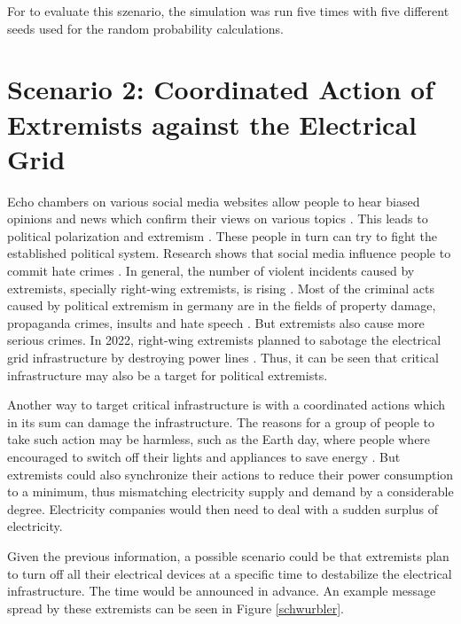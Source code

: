 For to evaluate this szenario, the simulation was run five times with five 
different seeds used for the random probability calculations.
 

\section{Scenario 2: Coordinated Action of Extremists 
against the Electrical Grid}

Echo chambers on various social media websites allow people to 
hear biased opinions and news which confirm their views on 
various topics \cite{terren2021echo}. This leads to political
polarization and extremism \cite{van2022banality}.
These people in turn can try to fight the established political
system. Research shows that social media influence people
to commit hate crimes \cite{muller2021fanning}.
In general, the number of violent incidents caused by
extremists, specially right-wing extremists, is rising 
\cite{koehler2016right}. 
Most of the criminal acts caused by political extremism 
in germany are in the fields of property damage, 
propaganda crimes, insults and hate speech \cite{bmicrimestatistics}.
But extremists also cause more serious crimes. In 2022,
right-wing extremists planned to sabotage the electrical grid 
infrastructure by destroying power lines \cite{anschlagstrom}.
Thus, it can be seen that critical infrastructure may also be a target
for political extremists. 

Another way to target critical infrastructure is with a coordinated
actions which in its sum can damage the infrastructure. The 
reasons for a group of people to take such action may be harmless,
such as the Earth day, where people where encouraged to switch off their 
lights and appliances to save energy \cite{earthday}.
But extremists could also synchronize their actions to reduce their
power consumption to a minimum, thus mismatching electricity supply
and demand by a considerable degree. Electricity companies would 
then need to deal with a sudden surplus of electricity.

Given the previous information, a possible scenario could be 
that extremists plan to turn off all their electrical devices at 
a specific time to destabilize the electrical infrastructure. The
time would be announced in advance. An example message spread by
these extremists can be seen in Figure \ref{schwurbler}.

